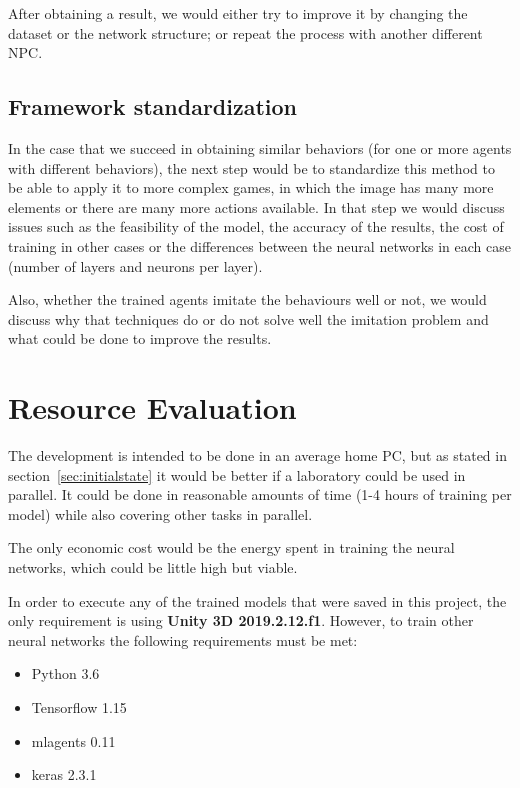 After obtaining a result, we would either try to improve it by changing the dataset or the network structure; or repeat the process with another different NPC.

\subsection{Framework standardization}

In the case that we succeed in obtaining similar behaviors (for one or more agents with different behaviors), the next step would be to standardize this method to be able to apply it to more complex games, in which the image has many more elements or there are many more actions available. In that step we would discuss issues such as the feasibility of the model, the accuracy of the results, the cost of training in other cases or the differences between the neural networks in each case (number of layers and neurons per layer).

Also, whether the trained agents imitate the behaviours well or not, we would discuss why that techniques do or do not solve well the imitation problem and what could be done to improve the results.

\section{Resource Evaluation}

The development is intended to be done in an average home PC, but as stated in section~\ref{sec:initialstate} it would be better if a laboratory could be used in parallel. It could be done in reasonable amounts of time (1-4 hours of training per model) while also covering other tasks in parallel.

The only economic cost would be the energy spent in training the neural networks, which could be little high but viable.

In order to execute any of the trained models that were saved in this project, the only requirement is using \textbf{Unity 3D 2019.2.12.f1}. However, to train other neural networks the following requirements must be met:

\begin{itemize}
 \item Python 3.6
 \item Tensorflow 1.15
 \item mlagents 0.11
 \item keras 2.3.1
\end{itemize}

